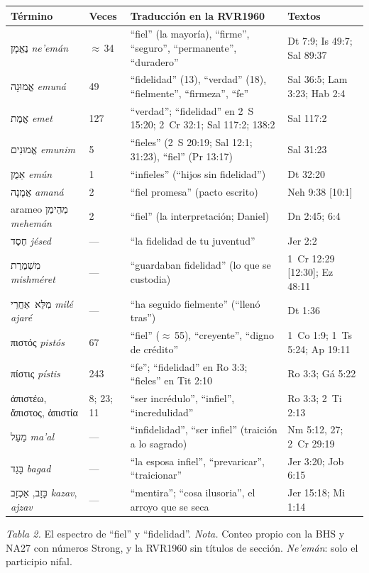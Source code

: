 \documentclass[11pt,letterpaper]{article}
\newcommand{\heb}[1]{\mbox{\foreignlanguage{hebrew}{#1}}}
\newcommand{\grc}[1]{\foreignlanguage{ancientgreek}{#1}}
\begin{document}
\begin{center}\small\renewcommand{\arraystretch}{1.16}
\begin{tabular}{@{}L{3.6cm}L{1.3cm}L{5.2cm}L{4.4cm}@{}}
\toprule
\textbf{Término} & \textbf{Veces} & \textbf{Traducción en la RVR1960} & \textbf{Textos} \\ \midrule
\heb{נֶאֱמָן} \emph{ne'emán} & $\approx$\,34 & ``fiel'' (la mayoría), ``firme'', ``seguro'', ``permanente'', ``duradero'' & Dt 7:9; Is 49:7; Sal 89:37 \\
\heb{אֱמוּנָה} \emph{emuná} & 49 & ``fidelidad'' (13), ``verdad'' (18), ``fielmente'', ``firmeza'', ``fe'' & Sal 36:5; Lam 3:23; Hab 2:4 \\
\heb{אֱמֶת} \emph{emet} & 127 & ``verdad''; ``fidelidad'' en 2~S 15:20; 2~Cr 32:1; Sal 117:2; 138:2 & Sal 117:2 \\
\heb{אֱמוּנִים} \emph{emunim} & 5 & ``fieles'' (2~S 20:19; Sal 12:1; 31:23), ``fiel'' (Pr 13:17) & Sal 31:23 \\
\heb{אֵמֻן} \emph{emún} & 1 & ``infieles'' (``hijos sin fidelidad'') & Dt 32:20 \\
\heb{אֲמָנָה} \emph{amaná} & 2 & ``fiel promesa'' (pacto escrito) & Neh 9:38 [10:1] \\
arameo \heb{מְהֵימַן} \emph{mehemán} & 2 & ``fiel'' (la interpretación; Daniel) & Dn 2:45; 6:4 \\
\heb{חֶסֶד} \emph{jésed} & --- & ``la fidelidad de tu juventud'' & Jer 2:2 \\
\heb{מִשְׁמֶרֶת} \emph{mishméret} & --- & ``guardaban fidelidad'' (lo que se custodia) & 1~Cr 12:29 [12:30]; Ez 48:11 \\
\heb{מִלֵּא אַחֲרֵי} \emph{milé ajaré} & --- & ``ha seguido fielmente'' (``llenó tras'') & Dt 1:36 \\ \midrule
\grc{πιστός} \emph{pistós} & 67 & ``fiel'' ($\approx$\,55), ``creyente'', ``digno de crédito'' & 1~Co 1:9; 1~Ts 5:24; Ap 19:11 \\
\grc{πίστις} \emph{pístis} & 243 & ``fe''; ``fidelidad'' en Ro 3:3; ``fieles'' en Tit 2:10 & Ro 3:3; Gá 5:22 \\
\grc{ἀπιστέω}, \grc{ἄπιστος}, \grc{ἀπιστία} & 8; 23; 11 & ``ser incrédulo'', ``infiel'', ``incredulidad'' & Ro 3:3; 2~Ti 2:13 \\ \midrule
\heb{מַעַל} \emph{ma'al} & --- & ``infidelidad'', ``ser infiel'' (traición a lo sagrado) & Nm 5:12, 27; 2~Cr 29:19 \\
\heb{בָּגַד} \emph{bagad} & --- & ``la esposa infiel'', ``prevaricar'', ``traicionar'' & Jer 3:20; Job 6:15 \\
\heb{כָּזָב}, \heb{אַכְזָב} \emph{kazav}, \emph{ajzav} & --- & ``mentira''; ``cosa ilusoria'', el arroyo que se seca & Jer 15:18; Mi 1:14 \\
\bottomrule
\end{tabular}\par
{\footnotesize\color{gris}\textit{Tabla 2.} El espectro de ``fiel'' y ``fidelidad''. \textit{Nota.} Conteo propio con la BHS y NA27 con números Strong, y la RVR1960 sin títulos de sección. \emph{Ne'emán}: solo el participio nifal.}
\end{center}
\end{document}
